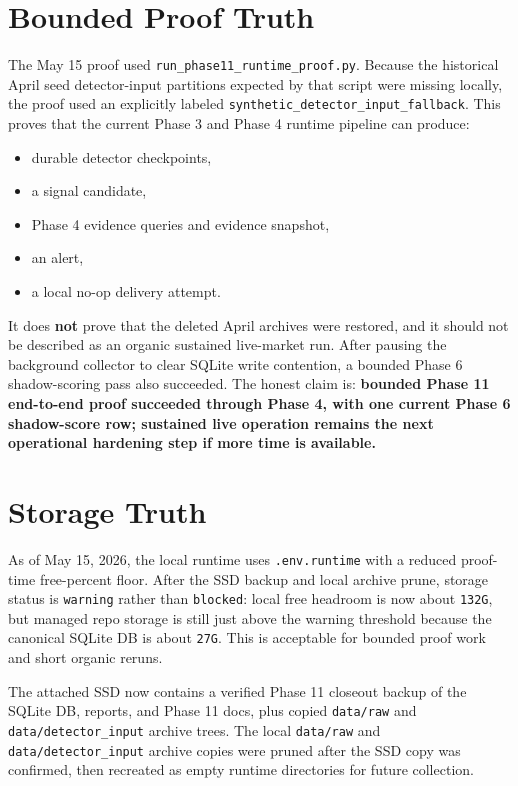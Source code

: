 \documentclass{article}
\begin{document}
\section*{Bounded Proof Truth}
The May 15 proof used \texttt{run\_phase11\_runtime\_proof.py}. Because the historical April seed detector-input partitions expected by that script were missing locally, the proof used an explicitly labeled \texttt{synthetic\_detector\_input\_fallback}. This proves that the current Phase 3 and Phase 4 runtime pipeline can produce:
\begin{itemize}
\item durable detector checkpoints,
\item a signal candidate,
\item Phase 4 evidence queries and evidence snapshot,
\item an alert,
\item a local no-op delivery attempt.
\end{itemize}

It does \textbf{not} prove that the deleted April archives were restored, and it should not be described as an organic sustained live-market run. After pausing the background collector to clear SQLite write contention, a bounded Phase 6 shadow-scoring pass also succeeded. The honest claim is: \textbf{bounded Phase 11 end-to-end proof succeeded through Phase 4, with one current Phase 6 shadow-score row; sustained live operation remains the next operational hardening step if more time is available.}

\section*{Storage Truth}
As of May 15, 2026, the local runtime uses \texttt{.env.runtime} with a reduced proof-time free-percent floor. After the SSD backup and local archive prune, storage status is \texttt{warning} rather than \texttt{blocked}: local free headroom is now about \texttt{132G}, but managed repo storage is still just above the warning threshold because the canonical SQLite DB is about \texttt{27G}. This is acceptable for bounded proof work and short organic reruns.

The attached SSD now contains a verified Phase 11 closeout backup of the SQLite DB, reports, and Phase 11 docs, plus copied \texttt{data/raw} and \texttt{data/detector\_input} archive trees. The local \texttt{data/raw} and \texttt{data/detector\_input} archive copies were pruned after the SSD copy was confirmed, then recreated as empty runtime directories for future collection.
\end{document}
